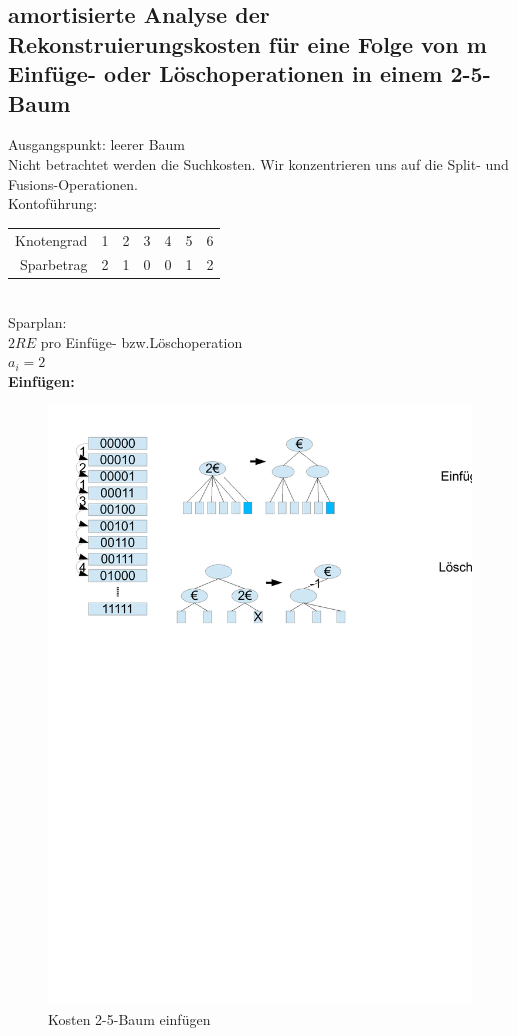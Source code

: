 \documentclass[a4paper,twoside,10pt]{report}
\begin{document}
\subsection{amortisierte Analyse der Rekonstruierungskosten für eine Folge von m Einfüge- oder Löschoperationen in einem 2-5-Baum}
Ausgangspunkt: leerer Baum\\
Nicht betrachtet werden die Suchkosten. Wir konzentrieren uns auf die Split- und Fusions-Operationen.\\[.5em]
Kontoführung:\\
\begin{tabular}{rcccccc}
Knotengrad&1&2&3&4&5&6\\
Sparbetrag&2&1&0&0&1&2
\end{tabular}\\[.5em]
Sparplan:\\
$2RE$ pro Einfüge- bzw.Löschoperation\\
$a_i=2$\\
\textbf{Einfügen:}
\begin{figure}[H]\center
\includegraphics[trim= 6cm 24cm 6cm 1cm,clip,width=.9\columnwidth]{figures/zaehler.pdf}
\caption{Kosten 2-5-Baum einfügen}
\end{figure}
\end{document}
